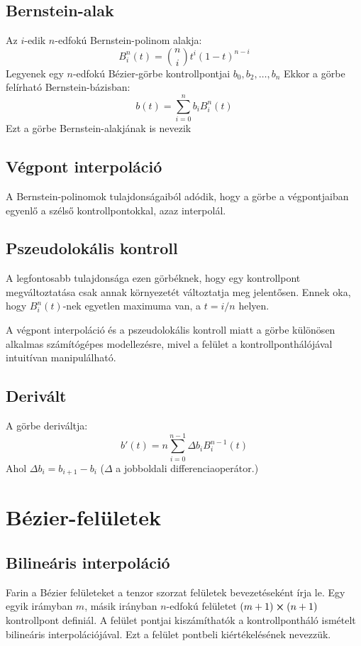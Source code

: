 \subsection{Bernstein-alak}
Az $i$-edik $n$-edfokú Bernstein-polinom alakja:
$$ B^n_i(t) = \binom{n}{i}t^i(1-t)^{n-i} $$
Legyenek egy $n$-edfokú Bézier-görbe kontrollpontjai $b_0,b_2,\dots,b_n$ Ekkor a görbe felírható Bernstein-bázisban:
$$ b(t) = \sum_{i=0}^n b_i B^n_i(t) $$
Ezt a görbe Bernstein-alakjának is nevezik

\subsection{Végpont interpoláció}
A Bernstein-polinomok tulajdonságaiból adódik, hogy a görbe a végpontjaiban egyenlő a szélső kontrollpontokkal, azaz interpolál.

\subsection{Pszeudolokális kontroll}
A legfontosabb tulajdonsága ezen görbéknek, hogy egy kontrollpont megváltoztatása csak annak környezetét változtatja meg jelentősen. Ennek oka, hogy $B^n_i(t)$-nek egyetlen maximuma van, a $t = i/n$ helyen. \cite[62. o.]{farin2002curves}

A végpont interpoláció és a pszeudolokális kontroll miatt a görbe különösen alkalmas számítógépes modellezésre, mivel a felület a kontrollponthálójával intuitívan manipulálható.

\subsection{Derivált}
A görbe deriváltja: \cite[63. o.]{farin2002curves}
$$ b'(t) = n\sum_{i=0}^{n-1} \Delta b_i B^{n-1}_i(t) $$
Ahol $\Delta b_i = b_{i+1} - b_i$ ($\Delta$ a jobboldali differenciaoperátor.)



\section{Bézier-felületek}

\subsection{Bilineáris interpoláció}
Farin a Bézier felületeket a tenzor szorzat felületek bevezetéseként írja le. Egy egyik irámyban $m$, másik irányban $n$-edfokú felületet $(m+1)\cross(n+1)$ kontrollpont definiál. A felület pontjai kiszámíthatók a kontrollpontháló ismételt bilineáris interpolációjával. Ezt a felület pontbeli kiértékelésének nevezzük.

